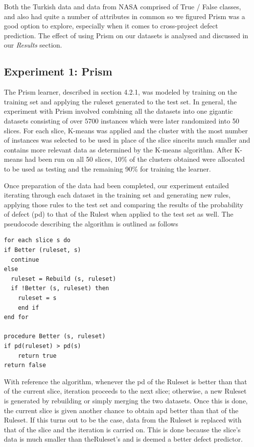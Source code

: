 \documentclass{sig-alternate}
\begin{document}
Both the Turkish data and data from NASA comprised of True / False classes, and also had quite a number of attributes in common so we figured Prism was a good option to explore, especially when it comes to cross-project defect prediction. The effect of using Prism on our datasets is analysed and discussed in our {\em Results} section.


\subsection{Experiment 1: Prism}

The Prism learner, described in section 4.2.1, was modeled by training on the training set and applying the ruleset generated to the test set. In general, the experiment with Prism involved combining all the datasets into one gigantic datasets consisting of over 5700 instances which were later randomized into 50 slices. For each slice, K-means was applied and the cluster with the most number of instances was selected to be used in place of the slice sinceits much smaller and contains more relevant data as determined by the K-means algorithm. After K-means had been run on all 50 slices, 10\% of the clusters obtained were allocated to be used as testing and the remaining 90\% for training the learner.

Once preparation of the data had been completed, our experiment entailed iterating through each dataset in the training set and generating new rules, applying those rules to the test set and comparing the results of the probability of defect (pd) to that of the Rulest when applied to the test set as well. The pseudocode describing the algorithm is outlined as follows


\begin{verbatim}
for each slice s do
if Better (ruleset, s)
  continue
else
  ruleset = Rebuild (s, ruleset)
  if !Better (s, ruleset) then
    ruleset = s
    end if
end for

procedure Better (s, ruleset)
if pd(ruleset) > pd(s)
    return true
return false

\end{verbatim}

With reference the algorithm, whenever the pd of the Ruleset is better than that of the current slice, iteration proceeds to the next slice; otherwise, a new Ruleset is generated by rebuilding or simply merging the two datasets. Once this is done, the current slice is given another chance to obtain apd better than that of the Ruleset. If this turns out to be the case, data from the Ruleset is replaced with that of the slice and the iteration is carried on. This is done because the slice's data is much smaller than theRuleset's and is deemed a better defect predictor.
\end{document}
